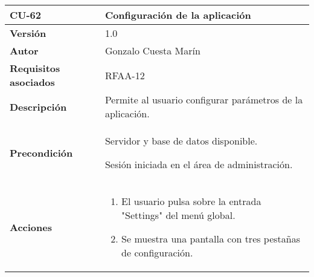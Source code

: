 \begin{longtable}[]{@{}ll@{}}
\toprule
\begin{minipage}[b]{0.21\columnwidth}\raggedright
\textbf{CU-62}\strut
\end{minipage} & \begin{minipage}[b]{0.73\columnwidth}\raggedright
\textbf{Configuración de la aplicación}\strut
\end{minipage}\tabularnewline
\midrule
\endhead
\begin{minipage}[t]{0.21\columnwidth}\raggedright
\textbf{Versión}\strut
\end{minipage} & \begin{minipage}[t]{0.73\columnwidth}\raggedright
1.0\strut
\end{minipage}\tabularnewline
\begin{minipage}[t]{0.21\columnwidth}\raggedright
\textbf{Autor}\strut
\end{minipage} & \begin{minipage}[t]{0.73\columnwidth}\raggedright
Gonzalo Cuesta Marín\strut
\end{minipage}\tabularnewline
\begin{minipage}[t]{0.21\columnwidth}\raggedright
\textbf{Requisitos asociados}\strut
\end{minipage} & \begin{minipage}[t]{0.73\columnwidth}\raggedright
RFAA-12\strut
\end{minipage}\tabularnewline
\begin{minipage}[t]{0.21\columnwidth}\raggedright
\textbf{Descripción}\strut
\end{minipage} & \begin{minipage}[t]{0.73\columnwidth}\raggedright
Permite al usuario configurar parámetros de la aplicación.\strut
\end{minipage}\tabularnewline
\begin{minipage}[t]{0.21\columnwidth}\raggedright
\textbf{Precondición}\strut
\end{minipage} & \begin{minipage}[t]{0.73\columnwidth}\raggedright
Servidor y base de datos disponible.

Sesión iniciada en el área de administración.\strut
\end{minipage}\tabularnewline
\begin{minipage}[t]{0.21\columnwidth}\raggedright
\textbf{Acciones}\strut
\end{minipage} & \begin{minipage}[t]{0.73\columnwidth}\raggedright
\begin{enumerate}
\def\labelenumi{\arabic{enumi}.}
\tightlist
\item
  El usuario pulsa sobre la entrada "Settings" del menú global.
\item
  Se muestra una pantalla con tres pestañas de configuración.


\end{enumerate}
\end{minipage}
\end{longtable}
